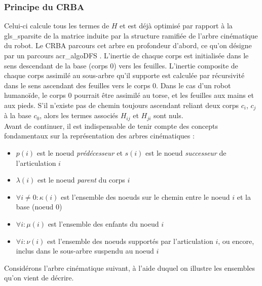 \documentclass{report}
\begin{document}
\subsubsection{Principe du CRBA}
Celui-ci calcule tous les termes de $H$ et est déjà optimisé par rapport à la \gls{gls_sparsite} de la matrice induite par la structure ramifiée de l'arbre cinématique du robot. Le CRBA parcours cet arbre en profondeur d'abord, ce qu'on désigne par un parcours \gls{acr_algoDFS} \cite{bib_deepFirstSearch}. L'inertie de chaque corps est initialisée dans le sens descendant de la base (corps 0) vers les feuilles. L'inertie composite de chaque corps assimilé au sous-arbre qu'il supporte est calculée par récursivité dans le sens ascendant des feuilles vers le corps 0. Dans le cas d'un robot humanoïde, le corps 0 pourrait être assimilé au torse, et les feuilles aux mains et aux pieds. S'il n'existe pas de chemin toujours ascendant reliant deux corps $c_i$, $c_j$ à la base $c_0$, alors les termes associés $H_{ij}$ et $H_{ji}$ sont nuls.\\
Avant de continuer, il est indispensable de tenir compte des concepts fondamentaux sur la représentation des arbres cinématiques \cite{ch_algSpa_equationMouvement}:

\begin{itemize}
\item $p(i)$ est le noeud \emph{prédécesseur} et $s(i)$ est le noeud \emph{successeur} de l'articulation $i$
\item $\lambda(i)$ est le noeud \emph{parent} du corps $i$
\item $\forall i \neq 0: \kappa(i)$ est l'ensemble des noeuds sur le chemin entre le noeud $i$ et la base (noeud $0$)
\item $\forall i: \mu (i)$  est l'ensemble des enfants du noeud $i$
\item $\forall i: \nu (i)$  est l'ensemble des noeuds supportés par l'articulation $i$, ou encore, inclus dans le sous-arbre suspendu au noeud $i$
\end{itemize}

Considérons l'arbre cinématique suivant, à l'aide duquel on illustre les ensembles qu'on vient de décrire.\\
\end{document}
